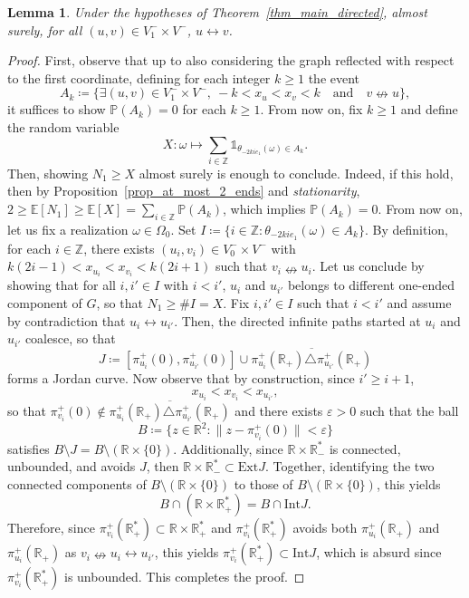 \documentclass[a4paper, 11pt]{article} %
\theoremstyle{plain}
\newtheorem{lemma}[theorem]{Lemma}
\newcommand{\Int}{\mathrm{Int}}
\newcommand{\Ext}{\mathrm{Ext}}
\newcommand{\E}{\mathbb{E}}
\newcommand{\R}{\mathbb{R}}
\newcommand{\Z}{\mathbb{Z}}
\newcommand{\1}{\mathds 1}
\renewcommand{\P}{\mathbb{P}}
\numberwithin{equation}{section}
\begin{document}
\begin{lemma}
    \label{prop_protected_path}
    Under the hypotheses of Theorem~\ref{thm_main_directed}, almost surely, for all $(u, v)\in V_1^-\times V^-$, $u\leftrightarrow v$.
\end{lemma}

\begin{proof}
    First, observe that up to also considering the graph reflected with respect to the first coordinate, defining for each integer $k\geq 1$ the event
        \[A_k\coloneq\{\exists (u,v)\in V_1^-\times V^-,~-k<x_u<x_v<k\quad\text{and}\quad v\nleftrightarrow u\},\]
    it suffices to show $\P(A_k)=0$ for each $k\geq1$. From now on, fix $k\geq1$ and define the random variable
        \[X:\omega\mapsto\sum_{i\in\Z}\1_{\theta_{-2kie_1}(\omega)\in A_k}.\]
    Then, showing $N_1\geq X$ almost surely is enough to conclude. Indeed, if this hold, then by Proposition~\ref{prop_at_most_2_ends} and \emph{stationarity}, $2\geq\E[N_1]\geq\E[X]=\sum_{i\in\Z}\P(A_k)$, which implies $\P(A_k)=0$. From now on, let us fix a realization $\omega\in\Omega_0$. Set $I\coloneqq\{i\in\Z:\theta_{-2kie_1}(\omega)\in A_k\}$. By definition, for each $i\in\Z$, there exists $(u_i,v_i)\in V_0^-\times V^-$ with $k(2i-1)<x_{u_i}<x_{v_i}<k(2i+1)$ such that $v_i\nleftrightarrow u_i$. Let us conclude by showing that for all $i,i'\in I$ with $i<i'$, $u_i$ and $u_{i'}$ belongs to different one-ended component of $G$, so that $N_1\geq\#I=X$. Fix $i,i'\in I$ such that $i<i'$ and assume by contradiction that $u_i\leftrightarrow u_{i'}$. Then, the directed infinite paths started at $u_i$ and $u_{i'}$ coalesce, so that
        \[J\coloneqq[\pi^+_{u_i}(0), \pi^+_{u_{i'}}(0)]\cup\overline{\pi^+_{u_i}(\R_+)\triangle \pi^+_{u_{i'}}(\R_+)}\]
    forms a Jordan curve. Now observe that by construction, since $i'\geq i+1$,
        \[x_{u_i}<x_{v_i}<x_{u_{i'}},\]
    so that $\pi^+_{v_i}(0)\notin\overline{\pi^+_{u_i}(\R_+)\triangle \pi^+_{u_{i'}}(\R_+)}$ and there exists $\varepsilon>0$ such that the ball 
        \[B\coloneqq\{z\in\R^2:\|z-\pi^+_{v_i}(0)\|<\varepsilon\}\]
    satisfies $B\setminus J=B\setminus(\R\times\{0\})$. Additionally, since $\R\times\R_-^*$ is connected, unbounded, and avoids $J$, then $\R\times\R_-^*\subset\Ext J$. Together, identifying the two connected components of $B\setminus(\R\times\{0\})$ to those of $B\setminus(\R\times\{0\})$, this yields
        \[B\cap (\R\times\R_+^*)=B\cap\Int J.\]
    Therefore, since $\pi^+_{v_i}(\R_+^*)\subset \R\times\R_+^*$ and $\pi^+_{v_i}(\R_+^*)$ avoids both $\pi^+_{u_i}(\R_+)$ and $\pi^+_{u_i}(\R_+)$ as $v_i\nleftrightarrow u_i\leftrightarrow u_{i'}$, this yields $\pi^+_{v_i}(\R_+^*)\subset\Int J$, which is absurd since $\pi^+_{v_i}(\R_+^*)$ is unbounded. This completes the proof.
\end{proof}
\end{document}
